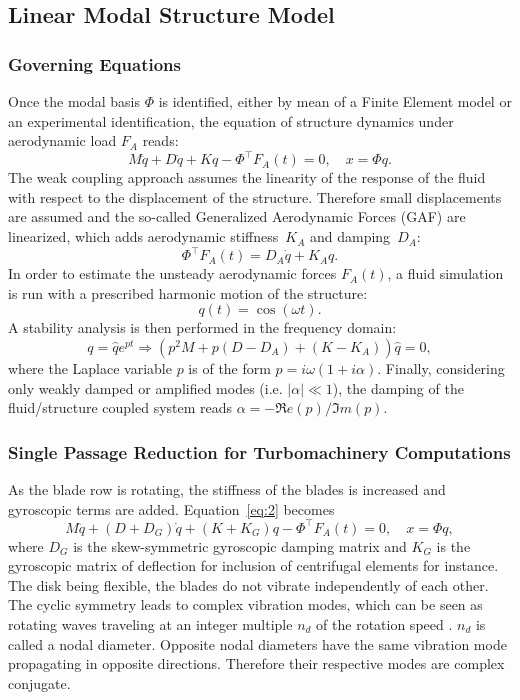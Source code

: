 \subsection{Linear Modal Structure Model}

\subsubsection{Governing Equations}
Once the modal basis $\Phi$ is identified, either by mean of a Finite
Element model or an experimental identification, the equation of
structure dynamics under aerodynamic load $F_A$ reads:
\begin{equation}
  \label{eq:2}
  M\ddot{q}+D\dot{q}+Kq-\Phi^\top F_A(t)=0, \quad x=\Phi q.
\end{equation}
The weak coupling approach assumes the linearity of the response of
the fluid with respect to the displacement of the structure. Therefore
small displacements are assumed and the so-called Generalized
Aerodynamic Forces (GAF) are linearized, which adds aerodynamic
stiffness~$K_A$ and damping~$D_A$:
\begin{equation}
  \label{eq:4}
  \Phi^\top F_A(t) = D_A\dot{q}+K_Aq.
\end{equation}
In order to estimate the unsteady aerodynamic forces $F_A(t)$,
  a fluid simulation is run with a prescribed harmonic motion of the
  structure:
\begin{equation}
  \label{eq:6}
  q(t)=\cos(\omega t).
\end{equation}
A stability analysis is then performed in the frequency domain:
\begin{equation}
  \label{eq:5}
  q=\hat{q}e^{p t}\Rightarrow\left(
    p^2M + p(D-D_A) + (K-K_A)
  \right)\hat{q}=0,
\end{equation}
where the Laplace variable $p$ is of the form
$p=i\omega(1+i\alpha)$. Finally, considering only weakly damped or
amplified modes (i.e. $|\alpha| \ll 1$), the damping of the
fluid/structure coupled system reads $\alpha=-\Re e(p)/\Im m(p)$.

\subsubsection{Single Passage Reduction for Turbomachinery Computations}

As the blade row is rotating, the stiffness of the blades is increased
and gyroscopic terms are added. Equation~\eqref{eq:2} becomes
\begin{equation}
  \label{eq:gyr}
  M\ddot{q}+(D+D_G)\dot{q}+(K+K_G)q-\Phi^\top F_A(t)=0, \quad x=\Phi q,
\end{equation}
where $D_G$ is the skew-symmetric gyroscopic damping matrix and $K_G$ is
the gyroscopic matrix of deflection for inclusion of centrifugal
elements for instance.  The disk being flexible, the blades do not vibrate
independently of each other. The cyclic symmetry leads to complex
vibration modes, which can be seen as rotating waves traveling at an
integer multiple $n_d$ of the rotation speed \cite{Lane:1956fk}. $n_d$
is called a nodal diameter. Opposite nodal diameters have the same
vibration mode propagating in opposite directions. Therefore their
respective modes are complex conjugate.



